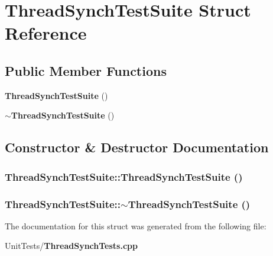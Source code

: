 \section{Thread\-Synch\-Test\-Suite Struct Reference}
\label{struct_thread_synch_test_suite}
\subsection*{Public Member Functions}
\begin{CompactItemize}
\item 
{\bf Thread\-Synch\-Test\-Suite} ()
\item 
{\bf $\sim$Thread\-Synch\-Test\-Suite} ()
\end{CompactItemize}


\subsection{Constructor \& Destructor Documentation}
\subsubsection{\setlength{\rightskip}{0pt plus 5cm}Thread\-Synch\-Test\-Suite::Thread\-Synch\-Test\-Suite ()\hspace{0.3cm}{\tt  [inline]}}\label{struct_thread_synch_test_suite_a0357635abeb713f7a0a81b27e8e1e37}


\subsubsection{\setlength{\rightskip}{0pt plus 5cm}Thread\-Synch\-Test\-Suite::$\sim$Thread\-Synch\-Test\-Suite ()\hspace{0.3cm}{\tt  [inline]}}\label{struct_thread_synch_test_suite_95113cc9daa6d97273c55b482326dfa8}




The documentation for this struct was generated from the following file:\begin{CompactItemize}
\item 
Unit\-Tests/{\bf Thread\-Synch\-Tests.cpp}\end{CompactItemize}
